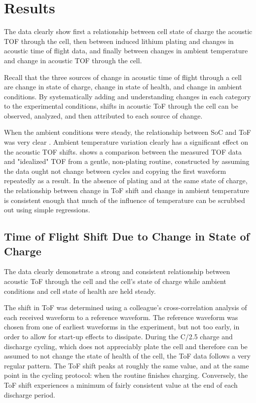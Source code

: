 \chapter{Results}

The data clearly show first a relationship between cell state of charge the acoustic TOF through the cell, then between induced lithium plating and changes in acoustic time of flight data, and finally between changes in ambient temperature and change in acoustic TOF through the cell. 

Recall that the three sources of change in acoustic time of flight through a cell are change in state of charge, change in state of health, and change in ambient conditions. 
By systematically adding and understanding changes in each category to the experimental conditions, shifts in acoustic ToF through the cell can be observed, analyzed, and then attributed to each source of change.

When the ambient conditions were steady, the relationship between SoC and ToF was very clear . Ambient temperature variation clearly has a significant effect on the acoustic TOF shifts.  shows a comparison between the measured TOF data and "idealized" TOF from a gentle, non-plating routine, constructed by assuming the data ought not change between cycles and copying the first waveform repeatedly as a result. In the absence of plating and at the same state of charge, the relationship between change in ToF shift and change in ambient temperature is consistent enough that much of the influence of temperature can be scrubbed out using simple regressions.

\section{Time of Flight Shift Due to Change in State of Charge}
The data clearly demonstrate a strong and consistent relationship between acoustic ToF through the cell and the cell's state of charge while ambient conditions and cell state of health are held steady.

The shift in ToF was determined using a colleague's cross-correlation analysis of each received waveform to a reference waveform. The reference waveform was chosen from one of earliest waveforms in the experiment, but not too early, in order to allow for start-up effects to dissipate.
During the C/2.5 charge and discharge cycling, which does not appreciably plate the cell and therefore can be assumed to not change the state of health of the cell, the ToF data follows a very regular pattern. 
The ToF shift peaks at roughly the same value, and at the same point in the cycling protocol: when the routine finishes charging. 
Conversely, the ToF shift experiences a minimum of fairly consistent value at the end of each discharge period.

